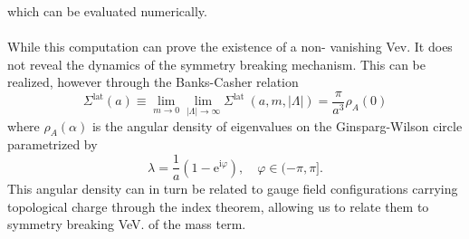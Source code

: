 \documentclass[a4paper,10pt]{article}
\begin{document}
which can be evaluated numerically.\\\\While this computation can prove the existence of a non- vanishing Vev. It does not reveal the dynamics of the symmetry breaking mechanism. This can be realized, however through the Banks-Casher relation \cite{BanksT1980Csbi}
\begin{equation}
\Sigma^{\mathrm{lat}}(a) \equiv \lim _{m \rightarrow 0} \lim _{|\Lambda| \rightarrow \infty} \Sigma^{\text {lat }}(a, m,|\Lambda|)=\frac{\pi}{a^{3}} \rho_{A}(0)
\end{equation}
where $\rho_{A}(\alpha)$ is the angular density of eigenvalues on the Ginsparg-Wilson circle parametrized by 
\begin{equation}
\lambda=\frac{1}{a}\left(1-\mathrm{e}^{\mathrm{i} \varphi}\right), \quad \varphi \in(-\pi, \pi].
\end{equation}
This angular density can in turn be related to gauge field configurations carrying topological charge through the index theorem, allowing us to relate them to symmetry breaking VeV. of the mass term.
\end{document}
